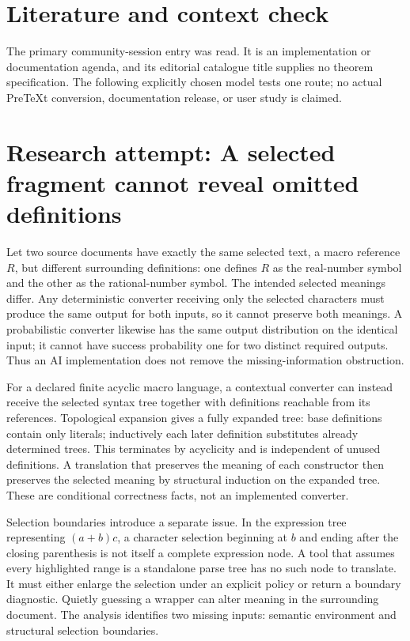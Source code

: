 \documentclass[11pt]{article}
\begin{document}
\section{Literature and context check}
The primary community-session entry was read. It is an implementation or documentation agenda, and its editorial catalogue title supplies no theorem specification. The following explicitly chosen model tests one route; no actual PreTeXt conversion, documentation release, or user study is claimed.
\section{Research attempt: A selected fragment cannot reveal omitted definitions}
Let two source documents have exactly the same selected text, a macro reference $R$, but different surrounding definitions: one defines $R$ as the real-number symbol and the other as the rational-number symbol. The intended selected meanings differ. Any deterministic converter receiving only the selected characters must produce the same output for both inputs, so it cannot preserve both meanings. A probabilistic converter likewise has the same output distribution on the identical input; it cannot have success probability one for two distinct required outputs. Thus an AI implementation does not remove the missing-information obstruction.

For a declared finite acyclic macro language, a contextual converter can instead receive the selected syntax tree together with definitions reachable from its references. Topological expansion gives a fully expanded tree: base definitions contain only literals; inductively each later definition substitutes already determined trees. This terminates by acyclicity and is independent of unused definitions. A translation that preserves the meaning of each constructor then preserves the selected meaning by structural induction on the expanded tree. These are conditional correctness facts, not an implemented converter.

Selection boundaries introduce a separate issue. In the expression tree representing $(a+b)c$, a character selection beginning at $b$ and ending after the closing parenthesis is not itself a complete expression node. A tool that assumes every highlighted range is a standalone parse tree has no such node to translate. It must either enlarge the selection under an explicit policy or return a boundary diagnostic. Quietly guessing a wrapper can alter meaning in the surrounding document. The analysis identifies two missing inputs: semantic environment and structural selection boundaries.
\end{document}
